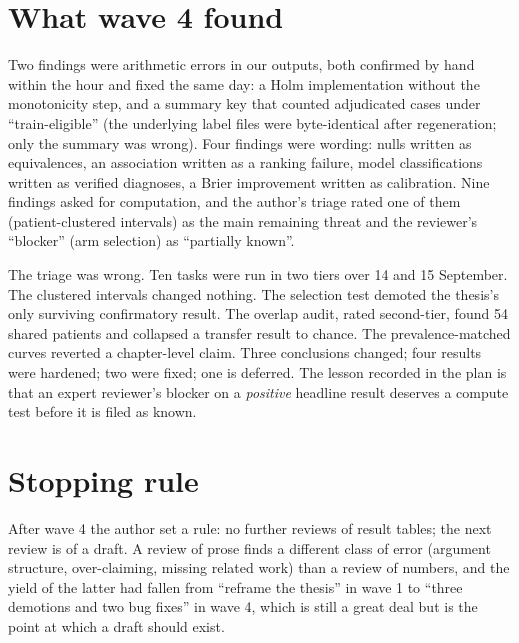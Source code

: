\section{What wave 4 found}

Two findings were arithmetic errors in our outputs, both confirmed by hand within the hour and fixed the same day: a Holm implementation without the monotonicity step, and a summary key that counted adjudicated cases under ``train-eligible'' (the underlying label files were byte-identical after regeneration; only the summary was wrong). Four findings were wording: nulls written as equivalences, an association written as a ranking failure, model classifications written as verified diagnoses, a Brier improvement written as calibration. Nine findings asked for computation, and the author's triage rated one of them (patient-clustered intervals) as the main remaining threat and the reviewer's ``blocker'' (arm selection) as ``partially known''.

The triage was wrong. Ten tasks were run in two tiers over 14 and 15 September. The clustered intervals changed nothing. The selection test demoted the thesis's only surviving confirmatory result. The overlap audit, rated second-tier, found 54 shared patients and collapsed a transfer result to chance. The prevalence-matched curves reverted a chapter-level claim. Three conclusions changed; four results were hardened; two were fixed; one is deferred. The lesson recorded in the plan is that an expert reviewer's blocker on a \emph{positive} headline result deserves a compute test before it is filed as known.

\section{Stopping rule}

After wave 4 the author set a rule: no further reviews of result tables; the next review is of a draft. A review of prose finds a different class of error (argument structure, over-claiming, missing related work) than a review of numbers, and the yield of the latter had fallen from ``reframe the thesis'' in wave 1 to ``three demotions and two bug fixes'' in wave 4, which is still a great deal but is the point at which a draft should exist.
